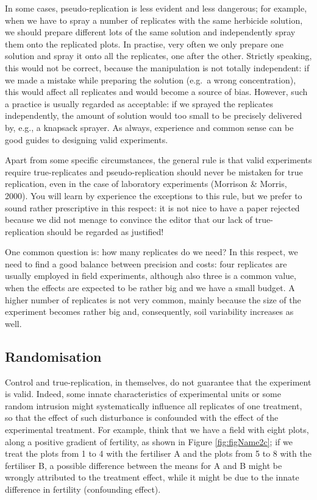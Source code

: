 \documentclass[a4paper,12pt,oneside]{book}
\begin{document}
In some cases, pseudo-replication is less evident and less dangerous; for example, when we have to spray a number of replicates with the same herbicide solution, we should prepare different lots of the same solution and independently spray them onto the replicated plots. In practise, very often we only prepare one solution and spray it onto all the replicates, one after the other. Strictly speaking, this would not be correct, because the manipulation is not totally independent: if we made a mistake while preparing the solution (e.g.~a wrong concentration), this would affect all replicates and would become a source of bias. However, such a practice is usually regarded as acceptable: if we sprayed the replicates independently, the amount of solution would too small to be precisely delivered by, e.g., a knapsack sprayer. As always, experience and common sense can be good guides to designing valid experiments.

Apart from some specific circumstances, the general rule is that valid experiments require true-replicates and pseudo-replication should never be mistaken for true replication, even in the case of laboratory experiments (Morrison \& Morris, 2000). You will learn by experience the exceptions to this rule, but we prefer to sound rather prescriptive in this respect: it is not nice to have a paper rejected because we did not menage to convince the editor that our lack of true-replication should be regarded as justified!

One common question is: how many replicates do we need? In this respect, we need to find a good balance between precision and costs: four replicates are usually employed in field experiments, although also three is a common value, when the effects are expected to be rather big and we have a small budget. A higher number of replicates is not very common, mainly because the size of the experiment becomes rather big and, consequently, soil variability increases as well.

\hypertarget{randomisation}{%
\subsection{Randomisation}\label{randomisation}}

Control and true-replication, in themselves, do not guarantee that the experiment is valid. Indeed, some innate characteristics of experimental units or some random intrusion might systematically influence all replicates of one treatment, so that the effect of such disturbance is confounded with the effect of the experimental treatment. For example, think that we have a field with eight plots, along a positive gradient of fertility, as shown in Figure \ref{fig:figName2c}; if we treat the plots from 1 to 4 with the fertiliser A and the plots from 5 to 8 with the fertiliser B, a possible difference between the means for A and B might be wrongly attributed to the treatment effect, while it might be due to the innate difference in fertility (confounding effect).
\end{document}
